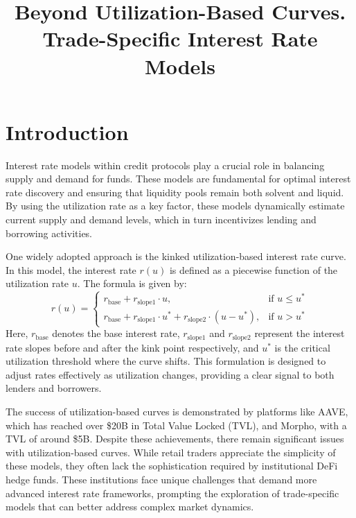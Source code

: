 \documentclass[12pt]{article}
\title{Beyond Utilization-Based Curves. Trade-Specific Interest Rate Models}
\author{}
\date{}
\begin{document}
\maketitle

\begin{abstract}
\end{abstract}

\section{Introduction}

Interest rate models within credit protocols play a crucial role in balancing supply and demand for funds. These models are fundamental for optimal interest rate discovery and ensuring that liquidity pools remain both solvent and liquid. By using the utilization rate as a key factor, these models dynamically estimate current supply and demand levels, which in turn incentivizes lending and borrowing activities.

One widely adopted approach is the kinked utilization-based interest rate curve. In this model, the interest rate \( r(u) \) is defined as a piecewise function of the utilization rate \( u \). The formula is given by:
\[
r(u) = 
\begin{cases} 
r_{\text{base}} + r_{\text{slope1}} \cdot u, & \text{if } u \leq u^* \\
r_{\text{base}} + r_{\text{slope1}} \cdot u^* + r_{\text{slope2}} \cdot (u - u^*), & \text{if } u > u^*
\end{cases}
\]
Here, \( r_{\text{base}} \) denotes the base interest rate, \( r_{\text{slope1}} \) and \( r_{\text{slope2}} \) represent the interest rate slopes before and after the kink point respectively, and \( u^* \) is the critical utilization threshold where the curve shifts. This formulation is designed to adjust rates effectively as utilization changes, providing a clear signal to both lenders and borrowers.

The success of utilization-based curves is demonstrated by platforms like AAVE, which has reached over \$20B in Total Value Locked (TVL), and Morpho, with a TVL of around \$5B. Despite these achievements, there remain significant issues with utilization-based curves. While retail traders appreciate the simplicity of these models, they often lack the sophistication required by institutional DeFi hedge funds. These institutions face unique challenges that demand more advanced interest rate frameworks, prompting the exploration of trade-specific models that can better address complex market dynamics.
\end{document}
